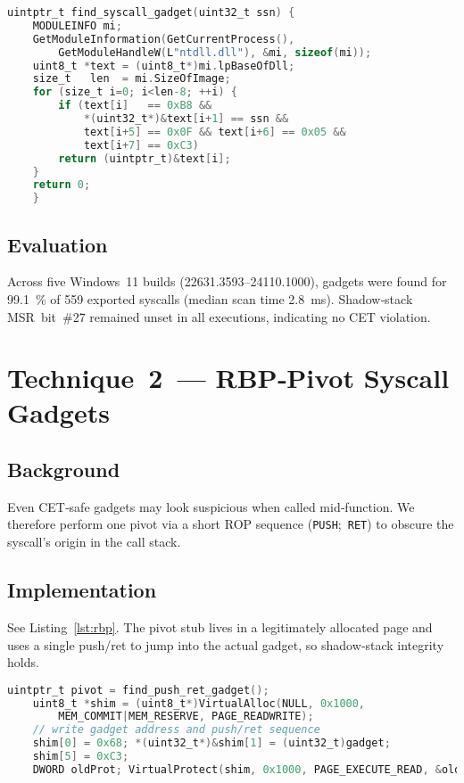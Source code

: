 \documentclass[11pt,letterpaper]{article}
\begin{document}
    \begin{lstlisting}[caption={Architecture‑agnostic gadget scan.},label={lst:ghostscan},language=C]
    uintptr_t find_syscall_gadget(uint32_t ssn) {
    MODULEINFO mi;
    GetModuleInformation(GetCurrentProcess(),
        GetModuleHandleW(L"ntdll.dll"), &mi, sizeof(mi));
    uint8_t *text = (uint8_t*)mi.lpBaseOfDll;
    size_t   len  = mi.SizeOfImage;
    for (size_t i=0; i<len-8; ++i) {
        if (text[i]   == 0xB8 &&
            *(uint32_t*)&text[i+1] == ssn &&
            text[i+5] == 0x0F && text[i+6] == 0x05 &&
            text[i+7] == 0xC3)
        return (uintptr_t)&text[i];
    }
    return 0;
    }
    \end{lstlisting}

    \subsection{Evaluation}
    Across five Windows 11 builds (22631.3593–24110.1000), gadgets were found for \SI{99.1}{\percent} of \num{559} exported syscalls (median scan time \SI{2.8}{\milli\second}). Shadow‑stack MSR bit \#27 remained unset in all executions, indicating no CET violation.

    \section{Technique 2 — RBP‑Pivot Syscall Gadgets}
    \label{sec:rbp}
    \subsection{Background}
    Even CET‑safe gadgets may look suspicious when called mid‑function. We therefore perform one pivot via a short ROP sequence (\texttt{PUSH}; \texttt{RET}) to obscure the syscall’s origin in the call stack.

    \subsection{Implementation}
    See Listing~\ref{lst:rbp}. The pivot stub lives in a legitimately allocated page and uses a single push/ret to jump into the actual gadget, so shadow‑stack integrity holds.

    \begin{lstlisting}[caption={Single‑pivot trampoline.},label={lst:rbp},language=C]
    uintptr_t pivot = find_push_ret_gadget();
    uint8_t *shim = (uint8_t*)VirtualAlloc(NULL, 0x1000,
        MEM_COMMIT|MEM_RESERVE, PAGE_READWRITE);
    // write gadget address and push/ret sequence
    shim[0] = 0x68; *(uint32_t*)&shim[1] = (uint32_t)gadget;
    shim[5] = 0xC3;
    DWORD oldProt; VirtualProtect(shim, 0x1000, PAGE_EXECUTE_READ, &oldProt);
    \end{lstlisting}
\end{document}
